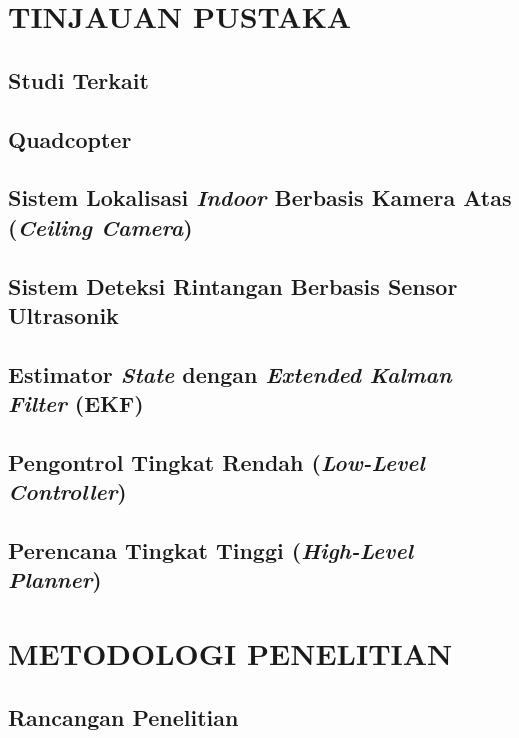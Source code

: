 \documentclass[12pt,a4paper]{report}
\begin{document}
\chapter{TINJAUAN PUSTAKA}
\section{Studi Terkait}
\section{Quadcopter}
\section{Sistem Lokalisasi \textit{Indoor} Berbasis Kamera Atas (\textit{Ceiling Camera})}
\section{Sistem Deteksi Rintangan Berbasis Sensor Ultrasonik}
\section{Estimator \textit{State} dengan \textit{Extended Kalman Filter} (EKF)}
\section{Pengontrol Tingkat Rendah (\textit{Low-Level Controller})}
\section{Perencana Tingkat Tinggi (\textit{High-Level Planner})}

\chapter{METODOLOGI PENELITIAN}
\section{Rancangan Penelitian}
\end{document}
